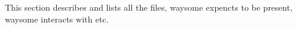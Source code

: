 
This section describes and lists all the files, waysome expencts to be present,
waysome interacts with etc.

